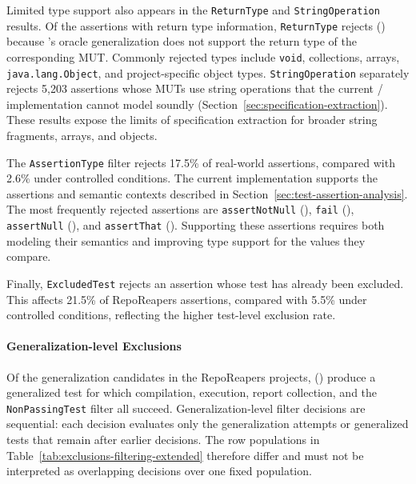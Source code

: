 Limited type support also appears in the \texttt{ReturnType} and
\texttt{StringOperation} results. Of the \TzRealworldReturnTypeEvaluated{} assertions with return
type information,
\texttt{ReturnType} rejects \TzRealworldReturnTypeRejected{}
(\TzRealworldReturnTypeRejectedPct{})
because \ToolTeralizer{}'s oracle generalization does not support the return type of the corresponding MUT.
Commonly rejected types include \texttt{void}, collections, arrays, \texttt{java.lang.Object}, and
project-specific object types. \texttt{StringOperation} separately rejects 5,203 assertions
whose MUTs use string operations that the current \ToolSPF{}/\ToolTeralizer{}
implementation cannot model soundly (Section~\ref{sec:specification-extraction}). These results
expose the limits of specification extraction for broader string fragments, arrays, and objects.

The \texttt{AssertionType} filter rejects 17.5\% of real-world assertions,
compared with 2.6\% under controlled conditions.
The current implementation supports the assertions
and semantic contexts described in Section~\ref{sec:test-assertion-analysis}.
The most frequently rejected assertions are
\texttt{assertNotNull} (\TzRealworldAssertionTypeAssertNotNull{}),
\texttt{fail} (\TzRealworldAssertionTypeFail{}), \texttt{assertNull}
(\TzRealworldAssertionTypeAssertNull{}), and \texttt{assertThat}
(\TzRealworldAssertionTypeAssertThat{}).
Supporting these assertions
requires both modeling their semantics
and improving type support for the values they compare.

Finally, \texttt{ExcludedTest} rejects an assertion whose test has already been excluded. This
affects 21.5\% of RepoReapers assertions, compared with 5.5\% under controlled conditions,
reflecting the higher test-level exclusion rate.

\paragraph{Generalization-level Exclusions}%
\label{par:real-world-generalization-exclusions}

Of the \TzRealworldGeneralizationAttempts{} generalization candidates in the RepoReapers projects,
\TzRealworldGeneralizationsValidated{} (\TzRealworldGeneralizationValidatedPct{})
produce a generalized test for which compilation, execution, report collection,
and the \texttt{NonPassingTest} filter all succeed.
Generalization-level filter decisions are sequential: each decision evaluates
only the generalization attempts or generalized tests that remain after earlier decisions.
The row populations in Table~\ref{tab:exclusions-filtering-extended}
therefore differ and must not be interpreted as overlapping decisions over one fixed population.

